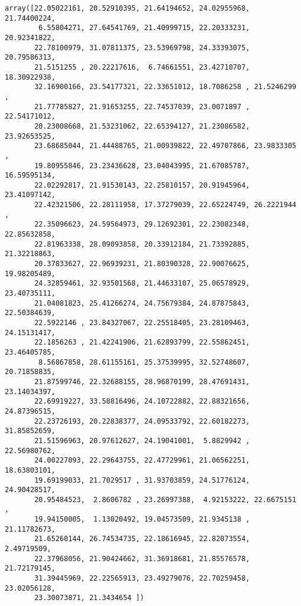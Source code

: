 \documentclass[11pt]{article}
\makeatletter
\newcommand{\boxspacing}{\kern\kvtcb@left@rule\kern\kvtcb@boxsep}
\newcommand{\prompt}[4]{
        \ttfamily\llap{{\color{#2}[#3]:\hspace{3pt}#4}}\vspace{-\baselineskip}
    }
\makeatother
\begin{document}
            \begin{tcolorbox}[breakable, size=fbox, boxrule=.5pt, pad at break*=1mm, opacityfill=0]
\prompt{Out}{outcolor}{53}{\boxspacing}
\begin{Verbatim}[commandchars=\\\{\}]
array([22.05022161, 20.52910395, 21.64194652, 24.02955968, 21.74400224,
        6.55804271, 27.64541769, 21.40999715, 22.20333231, 20.92341822,
       22.78100979, 31.07811375, 23.53969798, 24.33393075, 20.79586313,
       21.5151255 , 20.22217616,  6.74661551, 23.42710707, 18.30922938,
       32.16900166, 23.54177321, 22.33651012, 18.7086258 , 21.5246299 ,
       21.77785827, 21.91653255, 22.74537039, 23.0071897 , 22.54171012,
       20.23008668, 21.53231062, 22.65394127, 21.23086582, 23.92653525,
       23.68685044, 21.44488765, 21.00939822, 22.49707866, 23.9833305 ,
       19.80955846, 23.23436628, 23.04043995, 21.67085787, 16.59595134,
       22.02292817, 21.91530143, 22.25810157, 20.91945964, 23.41097142,
       22.42321506, 22.28111958, 17.37279039, 22.65224749, 26.2221944 ,
       22.35096623, 24.59564973, 29.12692301, 22.23082348, 22.85632858,
       22.81963338, 28.09093858, 20.33912184, 21.73392885, 21.32218863,
       20.37833627, 22.96939231, 21.80390328, 22.90076625, 19.98205489,
       24.32859461, 32.93501568, 21.44633107, 25.06578929, 23.40735111,
       21.04081823, 25.41266274, 24.75679384, 24.87875843, 22.50384639,
       22.5922146 , 23.84327067, 22.25518405, 23.28109463, 24.15131417,
       22.1856263 , 21.42241906, 21.62893799, 22.55862451, 23.46405785,
        8.56867858, 28.61155161, 25.37539995, 32.52748607, 20.71858835,
       21.87599746, 22.32688155, 28.96870199, 28.47691431, 23.14034397,
       22.69919227, 33.58816496, 24.10722882, 22.88321656, 24.87396515,
       22.23726193, 20.22838377, 24.09533792, 22.60182273, 31.85852659,
       21.51596963, 20.97612627, 24.19041001,  5.8829942 , 22.56980762,
       24.00227093, 22.29643755, 22.47729961, 21.06562251, 18.63803101,
       19.69199033, 21.7029517 , 31.93703859, 24.51776124, 24.90428517,
       20.95484523,  2.8606782 , 23.26997388,  4.92153222, 22.6675151 ,
       19.94150005,  1.13020492, 19.04573509, 21.9345138 , 21.11782673,
       21.65260144, 26.74534735, 22.18616945, 22.82073554,  2.49719509,
       22.37968056, 21.90424662, 31.36918681, 21.85576578, 21.72179145,
       31.39445969, 22.22565913, 23.49279076, 22.70259458, 23.02056128,
       23.30073871, 21.3434654 ])
\end{Verbatim}
\end{tcolorbox}
        
\end{document}
